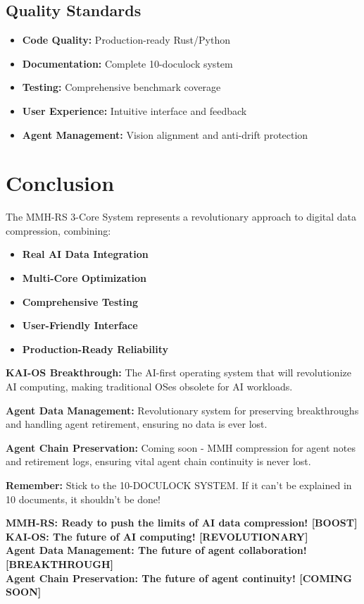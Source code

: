 \documentclass[12pt,a4paper]{article}
\begin{document}
\subsection{Quality Standards}
\begin{itemize}
    \item \textbf{Code Quality:} Production-ready Rust/Python
    \item \textbf{Documentation:} Complete 10-doculock system
    \item \textbf{Testing:} Comprehensive benchmark coverage
    \item \textbf{User Experience:} Intuitive interface and feedback
    \item \textbf{Agent Management:} Vision alignment and anti-drift protection
\end{itemize}

\section{Conclusion}

The MMH-RS 3-Core System represents a revolutionary approach to digital data compression, combining:
\begin{itemize}
    \item \textbf{Real AI Data Integration}
    \item \textbf{Multi-Core Optimization}
    \item \textbf{Comprehensive Testing}
    \item \textbf{User-Friendly Interface}
    \item \textbf{Production-Ready Reliability}
\end{itemize}

\textbf{KAI-OS Breakthrough:} The AI-first operating system that will revolutionize AI computing, making traditional OSes obsolete for AI workloads.

\textbf{Agent Data Management:} Revolutionary system for preserving breakthroughs and handling agent retirement, ensuring no data is ever lost.

\textbf{Agent Chain Preservation:} Coming soon - MMH compression for agent notes and retirement logs, ensuring vital agent chain continuity is never lost.

\textbf{Remember:} Stick to the 10-DOCULOCK SYSTEM. If it can't be explained in 10 documents, it shouldn't be done!

\vspace{1cm}

\begin{center}
\textbf{MMH-RS: Ready to push the limits of AI data compression! [BOOST]}\\
\textbf{KAI-OS: The future of AI computing! [REVOLUTIONARY]}\\
\textbf{Agent Data Management: The future of agent collaboration! [BREAKTHROUGH]}\\
\textbf{Agent Chain Preservation: The future of agent continuity! [COMING SOON]}
\end{center}
\end{document}

